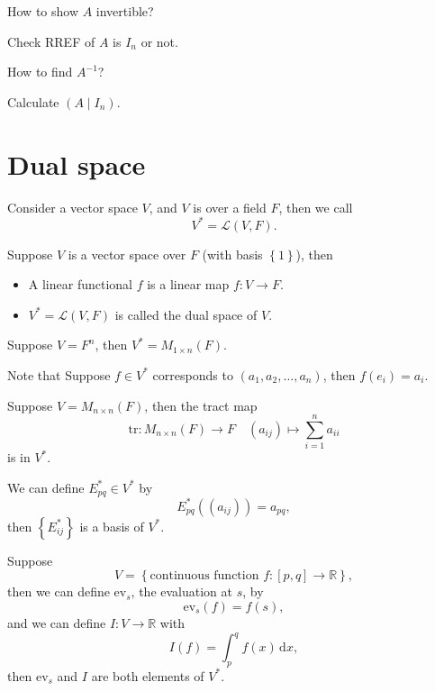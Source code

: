 \begin{question}
    How to show \(A\) invertible? 
\end{question}
\begin{answer}
    Check RREF of \(A\) is \(I_n\) or not.  
\end{answer}

\begin{question}
    How to find \(A^{-1}\)? 
\end{question}
\begin{answer}
    Calculate \((A \mid I_n)\). 
\end{answer}

\chapter{Dual space}
Consider a vector space \(V\), and \(V\) is over a field \(F\), then we call 
\[
    V^* = \mathcal{L} (V, F).
\]   

\begin{definition}
    Suppose \(V\) is a vector space over \(F\) (with basis \(\left\{ 1 \right\} \)), then 
    \begin{itemize}
        \item A linear functional \(f\) is a linear map \(f: V \to F\). 
        \item \(V^* = \mathcal{L} (V, F)\) is called the dual space of \(V\).     
    \end{itemize}  
\end{definition}

\begin{eg}
    Suppose \(V = F^n\), then \(V^* = M_{1 \times n}(F)\).  
\end{eg}
Note that Suppose \(f \in V^*\) corresponds to \((a_1, a_2, \dots , a_n)\), then \(f(e_i) = a_i\). 

\begin{eg}
    Suppose \(V = M_{n \times n}(F)\), then the tract map 
    \[
        \mathrm{tr}: M_{n \times n}(F) \to F \quad (a_{ij}) \mapsto \sum_{i=1}^n a_{ii}  
    \] is in \(V^*\). 
\end{eg}

\begin{eg}
    We can define \(E_{pq}^* \in V^*\) by 
    \[
        E_{pq}^*((a_{ij})) = a_{pq},
    \] then \(\left\{ E_{ij}^* \right\} \) is a basis of \(V^*\).   
\end{eg}

\begin{eg}
    Suppose
    \[
        V = \left\{ \text{continuous function }f: [p, q] \to \mathbb{R}  \right\}, 
    \] then we can define \(\mathrm{ev}_s \), the evaluation at \(s\), by 
    \[
        \mathrm{ev}_s(f) = f(s),
    \] and we can define \(I: V \to \mathbb{R} \) with 
    \[
        I(f) = \int_p^q f(x) \, \mathrm{d} x, 
    \] then \(\mathrm{ev}_s \) and \(I\) are both elements of \(V^*\).   
\end{eg}